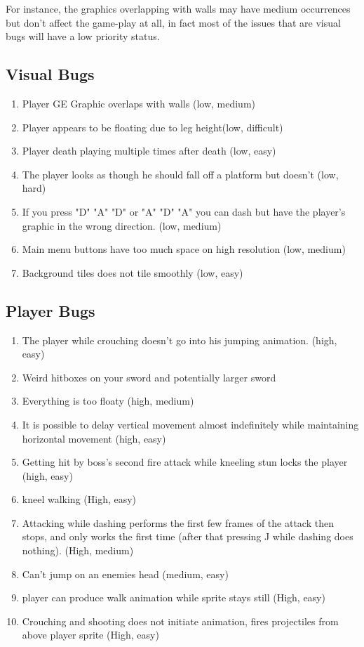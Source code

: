 \documentclass{article}
\begin{document}
For instance, the graphics overlapping with walls may have medium occurrences but don't affect the game-play at all, in fact most of the issues that are visual bugs will have a low priority status.  


\subsection*{Visual Bugs}
\begin{enumerate}
		\item Player GE Graphic overlaps with walls (low, medium)
		\item Player appears to be floating due to leg height(low, difficult)
		\item Player death playing multiple times after death (low, easy)
		\item The player looks as though he should fall off a platform but doesn't (low, hard)
		\item If you press "D" "A" "D" or "A" "D" "A" you can dash but have the player's graphic in the wrong  direction. (low, medium)
			\item Main menu  buttons have too much space on high resolution (low, medium)
				\item Background tiles does not tile smoothly (low, easy)
\end{enumerate}
\subsection*{Player Bugs}
\begin{enumerate}
	\item The player while crouching doesn't go into his jumping animation. (high, easy)
		\item Weird hitboxes on your sword and potentially larger sword
			\item Everything is too floaty (high, medium)
				\item It is possible to delay vertical movement almost indefinitely while maintaining horizontal movement (high, easy)
					\item Getting hit by boss's second fire attack while kneeling stun locks the player (high, easy)
						\item kneel walking (High, easy)
							\item Attacking while dashing performs the first few frames of the attack then stops, and only works the first time (after that pressing J while dashing does nothing). (High, medium)
								\item Can't jump on an enemies head (medium, easy)
									\item player can produce walk animation while sprite stays still (High, easy)
									\item Crouching and shooting does not initiate animation, fires projectiles from above player sprite (High, easy)
\end{enumerate}
\end{document}
